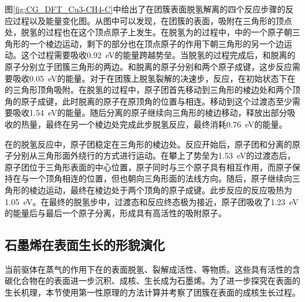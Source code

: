     图\ref{fig:CG_DFT_Cu3-CH4-C}中给出了在团簇表面脱氢解离的四个反应步骤的反应过程以及能量变化图。从图中可以发现，在团簇的表面，吸附在三角形的顶点处，脱氢的过程也在这个顶点原子上发生。在脱氢为的过程中，中的一个原子朝三角形的一个棱边运动，剩下的部分也在顶点原子的作用下朝三角形的另一个边运动。这个过程需要吸收\SI{0.92}{\electronvolt}的能量跨越势垒。当脱氢的过程完成后，和脱离的原子分别立于团簇三角形的两边。和脱离的原子分别和两个原子成键，这步反应需要吸收\SI{0.05}{\electronvolt}的能量。对于在团簇上脱氢裂解的决速步，反应，在初始状态下在的三角形顶角吸附。在脱氢的过程中，原子团首先移动到三角形的棱边处和两个顶角的原子成键，此时脱离的原子在原顶角的位置与相连。移动到这个过渡态至少需要吸收\SI{1.54}{\electronvolt}的能量。随后分离的原子继续向三角形的棱边移动，释放出部分吸收的热量，最终在另一个棱边处完成此步脱氢反应，最终消耗\SI{0.76}{\electronvolt}的能量。
    
    在的脱氢反应中，原子团稳定在三角形的棱边处。反应开始后，原子团和分离的原子分别从三角形面外绕行的方式进行运动。在攀上了势垒为\SI{1.53}{\electronvolt}的过渡态后，原子团位于三角形表面的中心位置，原子同时与三个原子具有相互作用，而原子保持在与一个顶角相连的位置，但也朝向三角形面的法线方向。随后，原子继续向三角形的棱边运动，最终在棱边处于两个顶角的原子成键。此步反应的反应吸热为\SI{1.05}{\electronvolt}。在最终的脱氢步中，过渡态和反应终态极为接近，原子团吸收了\SI{1.23}{\electronvolt}的能量后与最后一个原子分离，形成具有高活性的吸附原子。
    
    \subsection{石墨烯在表面生长的形貌演化}
    
    当前驱体在蒸气的作用下在的表面脱氢、裂解成活性、等物质。这些具有活性的含碳化合物在的表面进一步沉积、成核、生长成为石墨烯。为了进一步探究在表面的生长机理，本节使用第一性原理的方法计算并考察了团簇在表面的成核生长过程。
    

